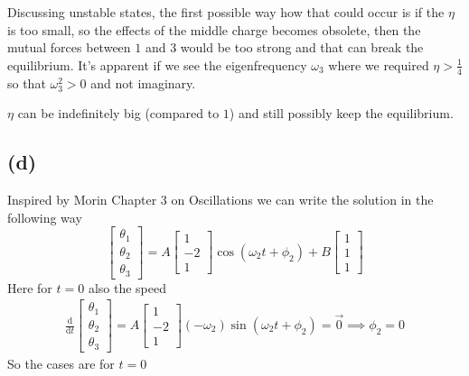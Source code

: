 \documentclass[letter, 10pts]{article}
\begin{document}
Discussing unstable states, the first possible way how that could occur is if the $\eta$ is too small, so the effects of the middle charge becomes obsolete, then the mutual forces between $1$ and $3$ would be too strong and that can break the equilibrium. It's apparent if we see the eigenfrequency $\omega_3$ where we required $\eta > \frac{1}{4}$ so that $\omega_3^2 > 0$ and not imaginary.

$\eta$ can be indefinitely big (compared to $1$) and still possibly keep the equilibrium. 





\subsection*{(d)} 
Inspired by Morin Chapter 3 on Oscillations we can write the solution in the following way 
\[
\begin{bmatrix} \theta_1 \\ \theta_2 \\\theta_3  \end{bmatrix} 
=
A \begin{bmatrix} 1 \\ - 2 \\ 1 \end{bmatrix} 
\cos(\omega_2 t + \phi_2) +
B \begin{bmatrix} 1 \\ 1 \\ 1 \end{bmatrix}  \] 
Here for $t = 0$ also the speed
\begin{align*}
	\frac{\mathrm{d} }{\mathrm{d}t} 
\begin{bmatrix} \theta_1 \\ \theta_2 \\\theta_3  \end{bmatrix}  = 
A \begin{bmatrix} 1 \\ -2 \\ 1 \end{bmatrix} (- \omega_2) \sin(\omega_2 t + \phi_2) = \vec{0} \implies \phi_2 = 0
\end{align*}
So the cases are  for $t = 0$
\end{document}
